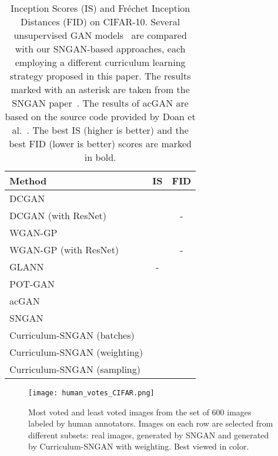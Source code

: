 \documentclass[10pt,twocolumn,letterpaper]{article}
\begin{document}
\begin{table}[t]
\setlength\tabcolsep{2.8pt}
\small{
\begin{center}
\begin{tabular}{|l|c|c|}
\hline
Method                                              & IS                & FID   \\
\hline
\hline
DCGAN~\cite{Radford-ICLR-2016}                      &      &  \\
DCGAN (with ResNet)~\cite{Radford-ICLR-2016}    &      & - \\
WGAN-GP~\cite{Miyato-ICLR-2018}                 &      &  \\
WGAN-GP (with ResNet)~\cite{Gulrajani-NIPS-2017}    &      & - \\
GLANN~\cite{Hoshen-CVPR-2019}                       & -                 &  \\
POT-GAN~\cite{Avraham-CVPR-2019}                    &      &  \\
acGAN~\cite{Doan-AAAI-2019}                         &      &  \\
\hline
SNGAN~\cite{Miyato-ICLR-2018}                   &      &  \\
\hline
Curriculum-SNGAN (batches)                          &      &  \\
Curriculum-SNGAN (weighting)                        &      &  \\
Curriculum-SNGAN (sampling)                         &  &  \\
\hline
\end{tabular}
\end{center}
\vspace*{-0.15cm}
\caption{Inception Scores (IS) and Fr\'echet Inception Distances (FID) on CIFAR-10. Several unsupervised GAN models~\cite{Avraham-CVPR-2019,Doan-AAAI-2019,Gulrajani-NIPS-2017,Hoshen-CVPR-2019,Miyato-ICLR-2018,Radford-ICLR-2016} are compared with our SNGAN-based approaches, each employing a different curriculum learning strategy proposed in this paper. The results marked with an asterisk are taken from the SNGAN paper~\cite{Miyato-ICLR-2018}. The results of acGAN are based on the source code provided by Doan et al.~\cite{Doan-AAAI-2019}. The best IS (higher is better) and the best FID (lower is better) scores are marked in bold.\label{tab_results_CIFAR}}
}
\vspace*{-0.1cm}
\end{table}

\begin{figure*}[!t]
\begin{center}
\texttt{[image: human\_votes\_CIFAR.png]}
\end{center}
\vspace*{-0.4cm}
\caption{Most voted and least voted images from the set of 600 images labeled by human annotators. Images on each row are selected from different subsets: real images, generated by SNGAN and generated by Curriculum-SNGAN with weighting. Best viewed in color.}
\label{fig_CIFAR_voted}
\vspace*{-0.4cm}
\end{figure*}
\end{document}
